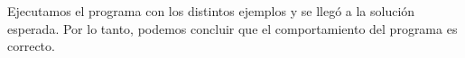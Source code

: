 \documentclass[11pt, a4paper, twoside]{article}
\begin{document}
\begin{enumerate}
\begin{itemize}
    \end{itemize}
  
Ejecutamos el programa con los distintos ejemplos y se llegó a la solución esperada. 
Por lo tanto, podemos concluir que el comportamiento del programa es correcto. 
  
\end{enumerate}
\end{document}
